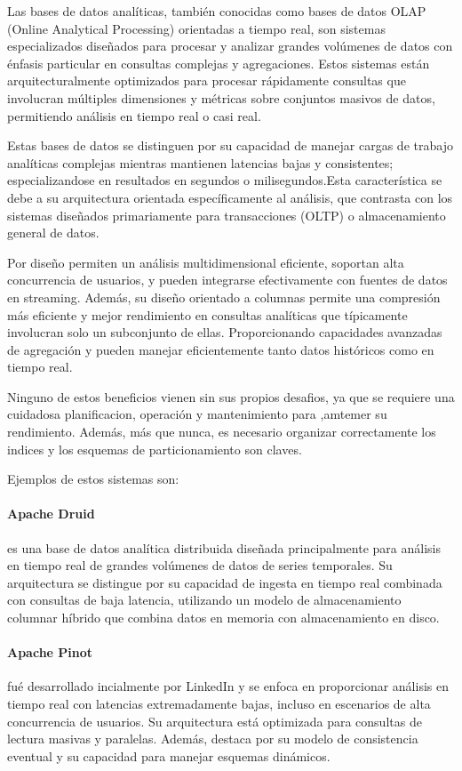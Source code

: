 Las bases de datos analíticas, también conocidas como bases de datos OLAP (Online Analytical Processing) orientadas a tiempo real, 
son sistemas especializados diseñados para procesar y analizar grandes volúmenes de datos con énfasis particular en consultas complejas y agregaciones. 
Estos sistemas están arquitecturalmente optimizados para procesar rápidamente consultas que involucran múltiples dimensiones y métricas sobre conjuntos masivos de datos, 
permitiendo análisis en tiempo real o casi real. 

Estas bases de datos se distinguen por su capacidad de manejar cargas de trabajo analíticas complejas mientras mantienen latencias bajas y consistentes; 
especializandose en resultados en segundos o milisegundos.Esta característica se debe a su arquitectura orientada específicamente al análisis, 
que contrasta con los sistemas diseñados primariamente para transacciones (OLTP) o almacenamiento general de datos.

Por diseño permiten un análisis multidimensional eficiente, soportan alta concurrencia de usuarios, y pueden integrarse efectivamente con fuentes de datos en streaming.
Además, su diseño orientado a columnas permite una compresión más eficiente y mejor rendimiento en consultas analíticas que típicamente involucran solo un subconjunto de ellas. 
Proporcionando capacidades avanzadas de agregación y pueden manejar eficientemente tanto datos históricos como en tiempo real.

Ninguno de estos beneficios vienen sin sus propios desafios, ya que se requiere una cuidadosa planificacion, operación y mantenimiento para ,amtemer su rendimiento.
Además, más que nunca, es necesario organizar correctamente los indices y los esquemas de particionamiento son claves.

Ejemplos de estos sistemas son:

\paragraph{Apache Druid}
es una base de datos analítica distribuida diseñada principalmente para análisis en tiempo real de grandes volúmenes de datos de series temporales. 
Su arquitectura se distingue por su capacidad de ingesta en tiempo real combinada con consultas de baja latencia, 
utilizando un modelo de almacenamiento columnar híbrido que combina datos en memoria con almacenamiento en disco. 

\paragraph{Apache Pinot} 
fué desarrollado incialmente por LinkedIn y se enfoca en proporcionar análisis en tiempo real con latencias extremadamente bajas, 
incluso en escenarios de alta concurrencia de usuarios. 
Su arquitectura está optimizada para consultas de lectura masivas y paralelas. 
Además, destaca por su modelo de consistencia eventual y su capacidad para manejar esquemas dinámicos.

